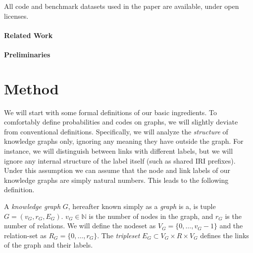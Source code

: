 \documentclass[11pt]{article}
\newcommand{\N}{{\mathbb N}}
\begin{document}
All code and benchmark datasets used in the paper are available, under open licenses.\footnotemark



\paragraph{Related Work}

\paragraph{Preliminaries}


\section{Method}

We will start with some formal definitions of our basic ingredients. To comfortably define probabilities and codes on graphs, we will slightly deviate from conventional definitions. Specifically, we will analyze the \emph{structure} of knowledge graphs only, ignoring any meaning they have outside the graph. For instance, we will distinguish between links with different labels, but we will ignore any internal structure of the label itself (such as shared IRI prefixes). Under this assumption we can assume that the node and link labels of our knowledge graphs are simply natural numbers. This leads to the following definition.

A \emph{knowledge graph} $G$, hereafter known simply as a \emph{graph} is a, is tuple $G = (v_G, r_G, E_G)$. $v_G \in \N$ is the number of nodes in the graph, and $r_G$ is the number of relations. We will define the nodeset as $V_G = \{0, \ldots, v_G-1\}$ and the relation-set as $R_G = \{0, \ldots, r_G\}$. The \emph{tripleset} $E_G \subset V_G \times R \times V_G$ defines the links of the graph and their labels. \footnotemark

\end{document}
